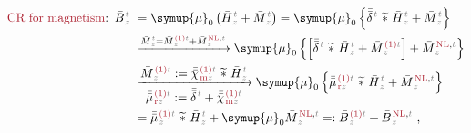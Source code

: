 \begin{subequations}
\begin{align}
	\textcolor{Maroon}{\text{CR for magnetism}}\text{:}&\hspace{0.5em} \bar{B}^{\;\!\textcolor{gray}{t}}_{\;\!\textcolor{gray}{z}} \hspace{-0.7em} &&={\symup{\mu}}_0 \left( \bar{H}^{\;\!\textcolor{gray}{t}}_{\;\!\textcolor{gray}{z}} + \bar{M}^{\;\!\textcolor{gray}{t}}_{\;\!\textcolor{gray}{z}} \right) = {\symup{\mu}}_0 \left\{ \bar{\bar{\delta}}^{\;\!\textcolor{gray}{t}}~\widetilde *~\bar{H}^{\;\!\textcolor{gray}{t}}_{\;\!\textcolor{gray}{z}} + \bar{M}^{\;\!\textcolor{gray}{t}}_{\;\!\textcolor{gray}{z}} \right\} \label{cr-b1} \\ & &&\xrightarrow[]{\bar{M}^{\;\!\textcolor{gray}{t}}_{\;\!\textcolor{gray}{z}} = \bar{M}^{\;\!\textcolor{Maroon}{\text{(1)}} \textcolor{gray}{t}}_{\;\!\textcolor{gray}{z}} + \bar{M}^{\;\!\textcolor{Maroon}{\text{NL}}, \textcolor{gray}{t}}_{\;\!\textcolor{gray}{z}}} {\symup{\mu}}_0 \left\{ \left[ \bar{\bar{\delta}}^{\;\!\textcolor{gray}{t}}~\widetilde *~\bar{H}^{\;\!\textcolor{gray}{t}}_{\;\!\textcolor{gray}{z}} + \bar{M}^{\;\!\textcolor{Maroon}{\text{(1)}} \textcolor{gray}{t}}_{\;\!\textcolor{gray}{z}} \right] + \bar{M}^{\;\!\textcolor{Maroon}{\text{NL}}, \textcolor{gray}{t}}_{\;\!\textcolor{gray}{z}} \right\} \label{cr-b2} \\ & &&\xrightarrow[\displaystyle{ \bar{\bar{\mu}}^{\;\!\textcolor{Maroon}{\text{(1)}} \textcolor{gray}{t}}_{\;\!\textcolor{Maroon}{\text{r}}\textcolor{gray}{z}} := \bar{\bar{\delta}}^{\;\!\textcolor{gray}{t}} + \bar{\bar{\chi}}^{\;\!\textcolor{Maroon}{\text{(1)}}\textcolor{gray}{t}}_{\;\!\textcolor{Maroon}{\text{m}} \textcolor{gray}{z}}}]{\displaystyle{\bar{M}^{\;\!\textcolor{Maroon}{\text{(1)}} \textcolor{gray}{t}}_{\;\!\textcolor{gray}{z}} := \bar{\bar{\chi}}^{\;\!\textcolor{Maroon}{\text{(1)}}\textcolor{gray}{t}}_{\;\!\textcolor{Maroon}{\text{m}} \textcolor{gray}{z}} ~\widetilde *~\bar{H}^{\;\!\textcolor{gray}{t}}_{\;\!\textcolor{gray}{z}}}} {\symup{\mu}}_0 \left\{ \bar{\bar{\mu}}^{\;\!\textcolor{Maroon}{\text{(1)}} \textcolor{gray}{t}}_{\;\!\textcolor{Maroon}{\text{r}}\textcolor{gray}{z}}~\widetilde *~\bar{H}^{\;\!\textcolor{gray}{t}}_{\;\!\textcolor{gray}{z}} + \bar{M}^{\;\!\textcolor{Maroon}{\text{NL}}, \textcolor{gray}{t}}_{\;\!\textcolor{gray}{z}} \right\} \label{cr-b3} \\ & &&= \bar{\bar{\mu}}^{\;\!\textcolor{Maroon}{\text{(1)}} \textcolor{gray}{t}}_{\;\!\textcolor{gray}{z}}~\widetilde *~\bar{H}^{\;\!\textcolor{gray}{t}}_{\;\!\textcolor{gray}{z}} + {\symup{\mu}}_0 \bar{M}^{\;\!\textcolor{Maroon}{\text{NL}}, \textcolor{gray}{t}}_{\;\!\textcolor{gray}{z}} =: \bar{B}^{\;\!\textcolor{Maroon}{\text{(1)}} \textcolor{gray}{t}}_{\;\!\textcolor{gray}{z}} + \bar{B}^{\;\!\textcolor{Maroon}{\text{NL}}, \textcolor{gray}{t}}_{\;\!\textcolor{gray}{z}}~, \label{cr-b4}
\end{align}
\end{subequations}
